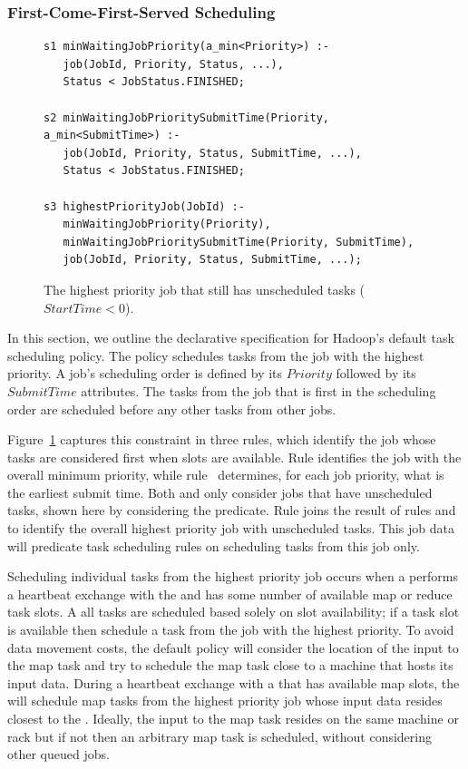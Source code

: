 \subsubsection{First-Come-First-Served Scheduling}

\begin{figure}
\label{fig:joborder}
\ssp
\centering
\begin{lstlisting}
s1 minWaitingJobPriority(a_min<Priority>) :-
   job(JobId, Priority, Status, ...),
   Status < JobStatus.FINISHED;
	
s2 minWaitingJobPrioritySubmitTime(Priority, a_min<SubmitTime>) :-
   job(JobId, Priority, Status, SubmitTime, ...),
   Status < JobStatus.FINISHED;

s3 highestPriorityJob(JobId) :-
   minWaitingJobPriority(Priority),
   minWaitingJobPrioritySubmitTime(Priority, SubmitTime),
   job(JobId, Priority, Status, SubmitTime, ...);
\end{lstlisting}
\caption{\label{ch:boom:fig:joborder}The highest priority job that still has unscheduled tasks ($StartTime < 0$).}
\end{figure}

In this section, we outline the declarative specification for Hadoop's default
task scheduling policy.  The policy schedules tasks from the job with the
highest priority.  A job's scheduling order is defined by its $Priority$
followed by its $SubmitTime$ attributes.  The tasks from the job that is first
in the scheduling order are scheduled before any other tasks from other jobs.

Figure~\ref{ch:boom:fig:joborder} captures this constraint in three rules,
which identify the job whose tasks are considered first when \TT slots are
available.  Rule  identifies the job with the overall minimum priority,
while rule~ determines, for each job priority, what is the earliest
submit time.  Both  and  only consider jobs that have unscheduled
tasks, shown here by considering the 
predicate.  Rule  joins the result of rules  and  to
identify the overall highest priority job with unscheduled tasks.  This job
data will predicate task scheduling rules on scheduling tasks from this job
only.

Scheduling individual tasks from the highest priority job occurs when a \TT
performs a heartbeat exchange with the \JT and has some number of available map
or reduce task slots.  A all tasks are scheduled based solely on slot
availability; if a task slot is available then schedule a task from the job
with the highest priority.  To avoid data movement costs, the default policy
will consider the location of the input to the map task and try to schedule the
map task close to a machine that hosts its input data.  During a heartbeat
exchange with a \TT that has available map slots, the \JT will schedule map
tasks from the highest priority job whose input data resides closest to the
\TT.  Ideally, the input to the map task resides on the same machine or rack
but if not then an arbitrary map task is scheduled, without considering other
queued jobs.


